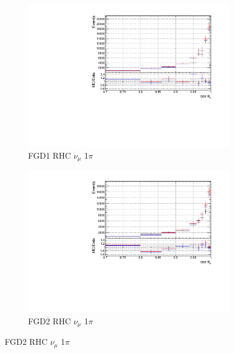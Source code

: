\begin{figure}[!htbp]
\begin{subfigure}{0.49\textwidth}
  \centering
  \includegraphics[width=\textwidth]{figs/priorpred1D_t_FGD1_NuMuBkg_CC1pi_in_AntiNu_Mode}
  \caption{FGD1 RHC $\nu_{\mu}$ 1$\pi$}
\end{subfigure}
\begin{subfigure}{0.49\textwidth}
  \centering
  \includegraphics[width=\textwidth]{figs/priorpred1D_t_FGD2_NuMuBkg_CC1pi_in_AntiNu_Mode}
  \caption{FGD2 RHC $\nu_{\mu}$ 1$\pi$}
\end{subfigure}


\end{figure}
